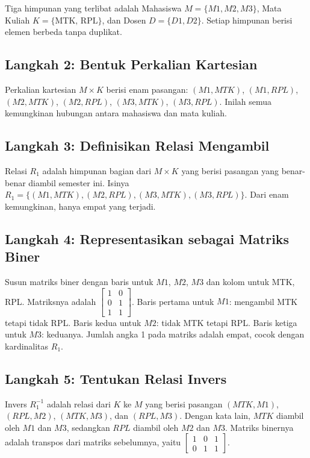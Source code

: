 \documentclass[11pt,a4paper]{article}
\begin{document}
Tiga himpunan yang terlibat adalah Mahasiswa $M=\{M1,M2,M3\}$, Mata Kuliah $K=\{\text{MTK, RPL}\}$, dan Dosen $D=\{D1,D2\}$. Setiap himpunan berisi elemen berbeda tanpa duplikat.

\subsection{Langkah 2: Bentuk Perkalian Kartesian}

Perkalian kartesian $M \times K$ berisi enam pasangan: $(M1,MTK)$, $(M1,RPL)$, $(M2,MTK)$, $(M2,RPL)$, $(M3,MTK)$, $(M3,RPL)$. Inilah semua kemungkinan hubungan antara mahasiswa dan mata kuliah.

\subsection{Langkah 3: Definisikan Relasi Mengambil}

Relasi $R_1$ adalah himpunan bagian dari $M \times K$ yang berisi pasangan yang benar-benar diambil semester ini. Isinya $R_1=\{(M1,MTK),(M2,RPL),(M3,MTK),(M3,RPL)\}$. Dari enam kemungkinan, hanya empat yang terjadi.

\subsection{Langkah 4: Representasikan sebagai Matriks Biner}

Susun matriks biner dengan baris untuk $M1$, $M2$, $M3$ dan kolom untuk MTK, RPL. Matriksnya adalah $\begin{bmatrix}1&0\\0&1\\1&1\end{bmatrix}$. Baris pertama untuk $M1$: mengambil MTK tetapi tidak RPL. Baris kedua untuk $M2$: tidak MTK tetapi RPL. Baris ketiga untuk $M3$: keduanya. Jumlah angka 1 pada matriks adalah empat, cocok dengan kardinalitas $R_1$.

\subsection{Langkah 5: Tentukan Relasi Invers}

Invers $R_1^{-1}$ adalah relasi dari $K$ ke $M$ yang berisi pasangan $(MTK,M1)$, $(RPL,M2)$, $(MTK,M3)$, dan $(RPL,M3)$. Dengan kata lain, $MTK$ diambil oleh $M1$ dan $M3$, sedangkan $RPL$ diambil oleh $M2$ dan $M3$. Matriks binernya adalah transpos dari matriks sebelumnya, yaitu $\begin{bmatrix}1&0&1\\0&1&1\end{bmatrix}$.
\end{document}
